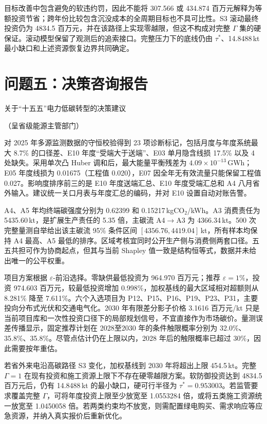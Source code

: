 \documentclass[UTF8,a4paper,zihao=-4,fontset=fandol]{ctexart}
\begin{document}
目标改善中包含避免的软违约罚，因此不能将 307.566 或 434.874 百万元解释为等额投资节省；跨年份比较包含沉没成本的全周期目标也不具可比性。S3 滚动最终投资仍为 4834.5 百万元，并在该路径上实现零越限，但这不构成对完整 $\Gamma$ 集的硬保证。滚动模型保留了观测后的追索接口。完整压力下的底线仍由 $\tau^*$、14.8488\,kt 最小缺口和上述资源恢复边界共同确定。

\section{问题五：决策咨询报告}

{\heiti 关于“十五五”电力低碳转型的决策建议}

{\kaishu （呈省级能源主管部门）}

\vspace{0.3em}
对 2025 年多源监测数据的守恒校验得到 23 项诊断标记，包括月度与年度系统最大 8.7\% 的口径差、E10 年度“受端大于送端”、E03 单月隐含线损 17.5\% 以及 4 处缺失。采用单次凸 Huber 调和后，最大能量平衡残差为 $4.09\times10^{-13}$\,GWh；E05 年度线损为 0.01675（工程值 0.020），E07 因全年无有效流量只能保留工程值 0.027。影响度排序前三的是 E10 年度送端汇总、E10 年度受端汇总和 A4 八月省外输入。建议统一关口月表与年度汇总的编码，并对 E10 设置自动对账告警。

A4、A5 年均终端碳强度分别为 0.62399 和 0.15217\,kgCO$_2$/kWh。A3 消费责任为 5435.60\,kt，是扩展生产责任的 5.35 倍，主碳流 A4$\to$A3 为 4366.34\,kt。500 次完整量测自举给出该主碳流 95\% 条件区间 $[4356.76,4419.04]$\,kt，所有样本均保持 A4 最高、A5 最低的排序。区域考核宜同时公开生产侧与消费侧两套口径。五五共担可作为协商起点，但其与当前 Shapley 值一致是结构恒等式，数据并未给出唯一的公平权重。

项目方案根据 $\varepsilon$-前沿选择。零缺供最低投资为 964.970 百万元；推荐 $\varepsilon=1\%$，投资 974.603 百万元，较最低投资增加 0.998\%，加权基线的最大区域相对超额则从 8.281\% 降至 7.611\%。六个入选项目为 P12、P15、P16、P19、P23、P31，主要投向分布式光伏和交通电气化。2030 年有限差分影子价格 3.1616 百万元/kt 只是当前项目库和一次性投资口径下的局部规划信号，不宜直接作为市场碳价。量测误差传播显示，固定推荐计划在 2028至2030 年的条件触限概率分别为 32.0\%、35.8\%、35.8\%。尽管点估计仍在上限以内，2028 年后的触限概率已超过 30\%，因此需要按年重估。

若省外来电沿高碳路径 S3 变化，加权基线到 2030 年将超出上限 454.5\,kt。完整 $\Gamma=1$ 在现有投资和施工资源上限下不存在硬零越限方案。软防御投资达到 4834.5 百万元后，仍有 14.8488\,kt 的最小缺口，硬可行半径为 $\tau^*=0.953003$。若监管要求覆盖完整 $\Gamma$，可将年度投资上限至少放宽至 1.0553284 倍，或将五类施工资源统一放宽至 1.0450058 倍。若两类约束均不放宽，则需配置绿电购买、需求响应等应急资源，并纳入真实报价后重新优化。
\end{document}

